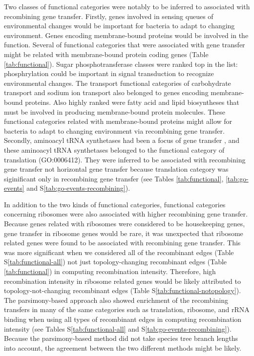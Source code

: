 \documentclass[english]{article}
\begin{document}
Two classes of functional categories were notably to be inferred to associated
with recombining gene transfer.  Firstly, genes involved in sensing queues of
environmental changes would be important for bacteria to adapt to changing
environment.  Genes encoding membrane-bound proteins would be involved in the
function.  Several of functional categories that were associated with gene
transfer might be related with membrane-bound protein coding genes (Table
\ref{tab:functional}).  Sugar phosphotransferase classes were ranked top in the
list: phosphrylation could be important in signal transduction to recognize
environmental changes.  The transport functional categories of carbohydrate
transport and sodium ion transport also belonged to genes encoding
membrane-bound proteins.  Also highly ranked were fatty acid and lipid
biosyntheses that must be involved in producing membrane-bound protein
molecules. These functional categories related with membrane-bound proteins
might allow for bacteria to adapt to changing environment via recombining gene
transfer.  Secondly, aminoacyl tRNA synthetases had been a focus of gene
transfer \citep{Woese2000}, and these aminoacyl tRNA synthetases belonged to the
functional category of translation (GO:0006412).  They were inferred to be
associated with recombining gene transfer not horizontal gene transfer because
translation category was siginificant only in recombining gene transfer (see
Tables \ref{tab:functional}, \ref{tab:go-events} and
S\ref{tab:go-events-recombining}).  

In addition to the two kinds of functional categories, functional categories
concerning ribosomes were also associated with higher recombining gene transfer.
Because genes related with ribosomes were considered to be housekeeping genes,
gene transfer in ribosome genes would be rare, it was unexpected that ribosome
related genes were found to be associated with recombining gene transfer. This
was more significant when we considered all of the recombinant edges (Table
S\ref{tab:functional-all}) not just topology-changing recombinant edges (Table
\ref{tab:functional}) in computing recombination intensity.  Therefore, high
recombination intensity in ribosome related genes would be likely attributed
to topology-not-changing recombinant edges (Table
S\ref{tab:functional-notopology}).  The parsimony-based approach also showed
enrichment of the recombining transfers in many of the same categories such as
translation, ribosome, and rRNA binding when using all types of recombinant
edges in computing recombination intensity (see Tables
S\ref{tab:functional-all} and S\ref{tab:go-events-recombining}).  Because the
parsimony-based method did not take species tree branch lengths into account, 
the agreement between the two different methods might be likely.
\end{document}
